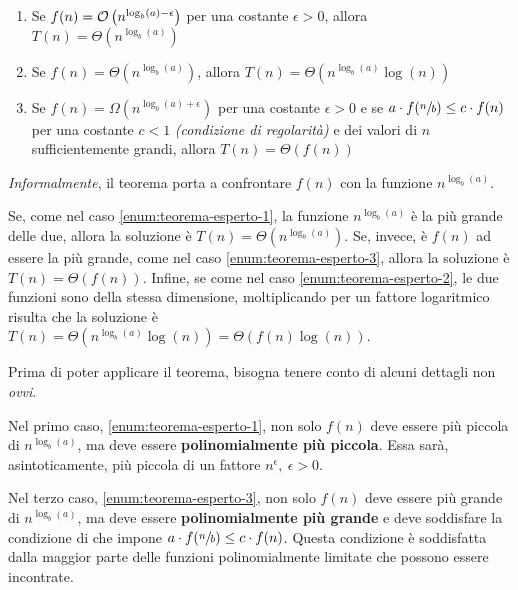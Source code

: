 \documentclass[italian, 10pt]{article}
\begin{document}
\begin{enumerate}[label=\arabic*), ref=(\arabic*)]
  \item\label{enum:teorema-esperto-1} Se \(f(n) = \mathcal{O}\left(n^{\log_b(a) - \epsilon}\right)\) per una costante \(\epsilon > 0\), allora \(T(n) = \Theta\left(n^{\log_b (a)}\right)\)
  \item\label{enum:teorema-esperto-2} Se \(f(n) = \Theta\left(n^{\log_b(a)}\right)\), allora \(T(n) = \Theta\left(n^{\log_b(a)} \log{(n)}\right)\)
  \item\label{enum:teorema-esperto-3} Se \(f(n) = \Omega\left(n^{\log_b(a) + \epsilon}\right)\) per una costante \(\epsilon > 0\) e se \(a \cdot f(\sfrac{n}{b}) \leq c \cdot f(n)\) per una costante \(c < 1\) \textit{(condizione di regolarità)} e dei valori di \(n\) sufficientemente grandi, allora \(T(n) = \Theta\left(f(n)\right)\)
\end{enumerate}

\bigskip
\textit{Informalmente}, il teorema porta a confrontare \(f(n)\) con la funzione \(n^{\log_b(a)}\).

Se, come nel caso \ref{enum:teorema-esperto-1}, la funzione \(n^{\log_b(a)}\) è la più grande delle due, allora la soluzione è \(T(n) = \Theta\left(n^{\log_b (a)}\right)\).
Se, invece, è \(f(n)\) ad essere la più grande, come nel caso \ref{enum:teorema-esperto-3}, allora la soluzione è \(T(n) = \Theta\left(f(n)\right)\).
Infine, se come nel caso \ref{enum:teorema-esperto-2}, le due funzioni sono della stessa dimensione, moltiplicando per un fattore logaritmico risulta che la soluzione è \(T(n) = \Theta\left(n^{\log_b(a)} \log{(n)}\right) = \Theta\left(f(n) \log{(n)}\right)\).

\bigskip
Prima di poter applicare il teorema, bisogna tenere conto di alcuni dettagli non \textit{ovvi}.

Nel primo caso, \ref{enum:teorema-esperto-1}, non solo \(f(n)\) deve essere più piccola di \(n^{\log_b(a)}\), ma deve essere \textbf{polinomialmente più piccola}.
Essa sarà, asintoticamente, più piccola di un fattore \(n^\epsilon,\ \epsilon>0\).

Nel terzo caso, \ref{enum:teorema-esperto-3}, non solo \(f(n)\) deve essere più grande di \(n^{\log_b(a)}\), ma deve essere \textbf{polinomialmente più grande} e deve soddisfare la condizione di  che impone \(a \cdot f(\sfrac{n}{b}) \leq c \cdot f(n)\).
Questa condizione è soddisfatta dalla maggior parte delle funzioni polinomialmente limitate che possono essere incontrate.
\end{document}
